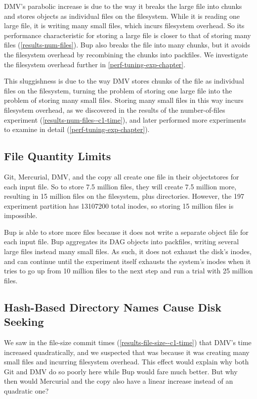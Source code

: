 DMV's parabolic increase is due to the way it breaks the large file into chunks and stores objects as individual files on the filesystem.
While it is reading one large file, it is writing many small files, which incurs filesystem overhead.
So its performance characteristic for storing a large file is closer to that of storing many files (\autoref{results-num-files}).
Bup also breaks the file into many chunks, but it avoids the filesystem overhead by recombining the chunks into \glspl{packfile}.
We investigate the filesystem overhead further in \autoref{perf-tuning-exp-chapter}.

This sluggishness is due to the way DMV stores chunks of the file as individual files on the filesystem, turning the problem of storing one large file into the problem of storing many small files.
Storing many small files in this way incurs filesystem overhead, as we discovered in the results of the number-of-files experiment (\autoref{results-num-files--c1-time}), and later performed more experiments to examine in detail (\autoref{perf-tuning-exp-chapter}).

\subsection{File Quantity Limits}

Git, Mercurial, DMV, and the copy all create one file in their \glspl{objectstore} for each input file.
So to store \num{7.5} million files, they will create \num{7.5} million more, resulting in \num{15} million files on the filesystem, plus directories.
However, the \SI{197}{\gib} experiment partition has \num{13107200} total \glspl{inode}, so storing \num{15} million files is impossible.

Bup is able to store more files because it does not write a separate object file for each input file.
Bup aggregates its DAG objects into \glspl{packfile}, writing several large files instead many small files.
As such, it does not exhaust the disk's \glspl{inode}, and can continue until the experiment itself exhausts the system's \glspl{inode} when it tries to go up from \num{10} million files to the next step and run a trial with \num{25} million files.

\subsection{Hash-Based Directory Names Cause Disk Seeking}

We saw in the file-size commit times (\autoref{results-file-size--c1-time}) that DMV's time increased quadratically, and we suspected that was because it was creating many small files and incurring filesystem overhead.
This effect would explain why both Git and DMV do so poorly here while Bup would fare much better.
But why then would Mercurial and the copy also have a linear increase instead of an quadratic one?

